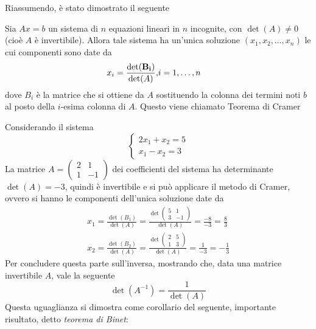 Riassumendo, è stato dimostrato il seguente
\begin{teo}
  \label{teo:Compinveeproddimatrici2}
  Sia $Ax=b$ un sistema di $n$ equazioni lineari in $n$ incognite, con $\det(A)\neq 0$ (cioè $A$ è
  invertibile). Allora tale sistema ha un'unica soluzione $(x_{1},x_2,\dots,x_n)$ le cui componenti
  sono date da
  \begin{eqnarray*}
    x_i=\frac{\bf \det(B_i)}{\det (A)}, & i=1,\dots,n
  \end{eqnarray*}
  dove $B_i$ è la matrice che si ottiene da $A$ sostituendo la colonna dei termini noti $b$ al posto
  della $i$-esima colonna di $A$. Questo viene chiamato Teorema di Cramer
\end{teo}
\begin{es}
  \label{es:Compinveeproddimatrici5}
  Considerando il sistema
  \begin{equation*}
    \begin{cases}
      2x_1+x_2=5\\
      x_1-x_2=3
    \end{cases}
  \end{equation*}
  La matrice $A=
  \begin{pmatrix}
    2 & 1 \\
    1 & -1
  \end{pmatrix}$ dei coefficienti del sistema ha determinante $\det(A)=-3$, quindi è invertibile e
  si può applicare il metodo di Cramer, ovvero si hanno le componenti dell'unica soluzione date da
  \begin{eqnarray*}
    x_1=\frac{\det(B_1)}{\det(A)}=\frac{\det
    \begin{pmatrix}
      5 & 1\\
      3 & -1
    \end{pmatrix}
    }{\det(A)}=\frac{-8}{-3}=\frac{8}{3}\\
    x_2=\frac{\det(B_2)}{\det(A)}=\frac{\det
    \begin{pmatrix}
      2 & 5\\
      1 & 3
    \end{pmatrix}
    }{\det(A)}=\frac{1}{-3}=-\frac{1}{3}
  \end{eqnarray*}
  Per concludere questa parte sull'inversa, mostrando che, data una matrice invertibile $A$, vale
  la seguente
  \begin{equation}
    \label{eq:Compinveeproddimatrici24}
    \det(A^{-1})=\frac{1}{\det(A)}
  \end{equation}
  Questa uguaglianza si dimostra come corollario del seguente, importante risultato, detto
  \textit{teorema di Binet}:
\end{es}
